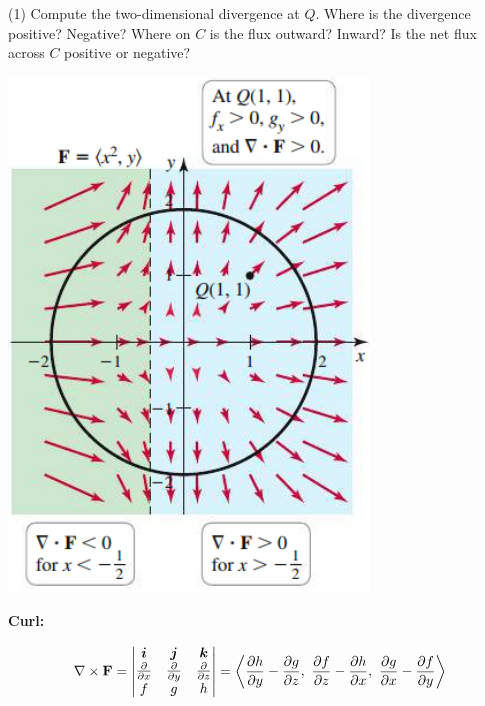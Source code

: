 \documentclass[mathNotesPreamble]{subfiles}
\begin{document}
  \noindent
  \begin{minipage}[t]{0.55\linewidth}
    \begin{tasks}[after-item-skip=5\baselineskip, label=, item-indent=0pt](1)
      \task 
        Compute the two-dimensional divergence at $Q$.
      \task 
        Where is the divergence positive? Negative?
      \task 
        Where on $C$ is the flux outward? Inward?
      \task 
        Is the net flux across $C$ positive or negative?
    \end{tasks}
  \end{minipage}%
  \begin{minipage}[t]{0.45\linewidth}\mbox{}
    \vspace*{-2\baselineskip}
    \begin{flushright}
      \includegraphics[width=0.75\linewidth]{images/briggs_17_05/fig17_39}
    \end{flushright}
  \end{minipage}
  \pagebreak

  \noindent
  \textbf{Curl:}

  \[\nabla\times\mathbf F=
      \begin{vmatrix}
        {\bm{i}}& {\bm{j}}& {\bm{k}}\\
        \frac{\partial}{\partial x}& \frac{\partial}{\partial y}& \frac{\partial}{\partial z}\\
        f& g& h
      \end{vmatrix}
      ={\left\langle 
      \frac{\partial h}{\partial y}-\frac{\partial g}{\partial z},\
      \frac{\partial f}{\partial z}-\frac{\partial h}{\partial x},\
      \frac{\partial g}{\partial x}-\frac{\partial f}{\partial y} \right\rangle}
    \]
\end{document}
